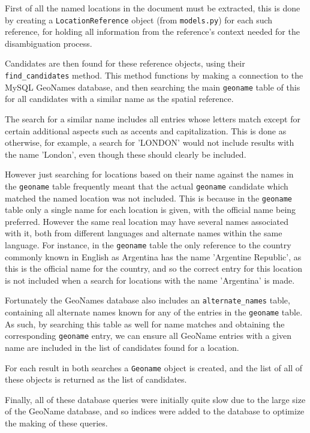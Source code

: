 \documentclass[12pt, a4paper]{report}
\begin{document}
First of all the named locations in the document must be extracted, this is done by creating a \verb#LocationReference# object (from \verb#models.py#) for each such reference, for holding all information from the reference's context needed for the disambiguation process.

Candidates are then found for these reference objects, using their \verb#find_candidates# method. This method functions by making a connection to the MySQL GeoNames database, and then searching the main \verb#geoname# table of this for all candidates with a similar name as the spatial reference.

The search for a similar name includes all entries whose letters match except for certain additional aspects such as accents and capitalization. This is done as otherwise, for example, a search for 'LONDON' would not include results with the name 'London', even though these should clearly be included.

However just searching for locations based on their name against the names in the \verb#geoname# table frequently meant that the actual \verb#geoname# candidate  which matched the named location was not included. This is because in the \verb#geoname# table only a single name for each location is given, with the official name being preferred. However the same real location may have several names associated with it, both from different languages and alternate names within the same language. For instance, in the \verb#geoname# table the only reference to the country commonly known in English as Argentina has the name 'Argentine Republic', as this is the official name for the country, and so the correct entry for this location is not included when a search for locations with the name 'Argentina' is made.

Fortunately the GeoNames database also includes an \verb#alternate_names# table, containing all alternate names known for any of the entries in the \verb#geoname# table. As such, by searching this table as well for name matches and obtaining the corresponding \verb#geoname# entry, we can ensure all GeoName entries with a given name are included in the list of candidates found for a location.

For each result in both searches a \verb#Geoname# object is created, and the list of all of these objects is returned as the list of candidates.

Finally, all of these database queries were initially quite slow due to the large size of the GeoName database, and so indices were added to the database to optimize the making of these queries.
\end{document}

